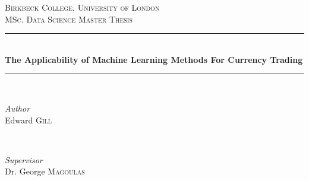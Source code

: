 \documentclass[11pt]{article}
\begin{document}
\begin{titlepage} %
	\newcommand{\HRule}{\rule{\linewidth}{0.5mm}} %
	
	\center %
	
	
	\textsc{\Large Birkbeck College, University of London}\\[1.5cm] %
	
	\textsc{\Large MSc. Data Science Master Thesis}\\[0.5cm] %
		
	
	\HRule\\[0.4cm]
	
	{\huge\bfseries The Applicability of Machine Learning Methods For Currency Trading}\\[0.4cm] %
	
	\HRule\\[1.5cm]
	
	
	\begin{minipage}{0.4\textwidth}
		\begin{flushleft}
			\large
			\textit{Author}\\
			Edward \textsc{Gill} %
		\end{flushleft}
	\end{minipage}
	~
	\begin{minipage}{0.4\textwidth}
		\begin{flushright}
			\large
			\textit{Supervisor}\\
			Dr. George \textsc{Magoulas} %
		\end{flushright}
	\end{minipage}
	
	

\end{titlepage}
\end{document}
